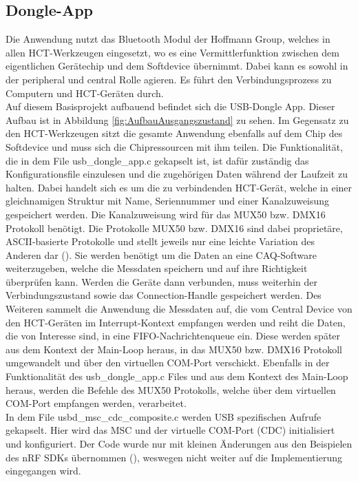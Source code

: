 \subsection{Dongle-App}
Die Anwendung nutzt das Bluetooth Modul der Hoffmann Group, welches in allen \ac{HCT}-Werkzeugen eingesetzt, wo es eine Vermittlerfunktion zwischen dem eigentlichen Gerätechip und dem Softdevice übernimmt. Dabei kann es sowohl in der peripheral und central Rolle agieren. Es führt den Verbindungsprozess zu Computern und \ac{HCT}-Geräten durch. \\
Auf diesem Basisprojekt aufbauend befindet sich die \ac{USB}-Dongle App. Dieser Aufbau ist in Abbildung \ref{fig:AufbauAusgangszustand} zu sehen. Im Gegensatz zu den \ac{HCT}-Werkzeugen sitzt die gesamte Anwendung ebenfalls auf dem Chip des Softdevice und muss sich die Chipressourcen mit ihm teilen. Die Funktionalität, die in dem File usb\_dongle\_app.c gekapselt ist, ist dafür zuständig das Konfigurationsfile einzulesen und die zugehörigen Daten während der Laufzeit zu halten. Dabei handelt sich es um die zu verbindenden \ac{HCT}-Gerät, welche in einer gleichnamigen Struktur mit Name, Seriennummer und einer Kanalzuweisung gespeichert werden. Die Kanalzuweisung wird für das MUX50 bzw. DMX16 Protokoll benötigt. Die Protokolle MUX50 bzw. DMX16 sind dabei proprietäre, \ac{ASCII}-basierte Protokolle und stellt jeweils nur eine leichte Variation des Anderen dar (\cite[s. 33]{HCT_Windows_App_Manual}). Sie werden benötigt um die Daten an eine \ac{CAQ}-Software weiterzugeben, welche die Messdaten speichern und auf ihre Richtigkeit überprüfen kann. Werden die Geräte dann verbunden, muss weiterhin der Verbindungszustand sowie das Connection-Handle gespeichert werden. Des Weiteren sammelt die Anwendung die Messdaten auf, die vom Central Device von den \ac{HCT}-Geräten im Interrupt-Kontext empfangen werden und reiht die Daten, die von Interesse sind, in eine \ac{FIFO}-Nachrichtenqueue ein. Diese werden später aus dem Kontext der Main-Loop heraus, in das MUX50 bzw. DMX16 Protokoll umgewandelt und über den virtuellen COM-Port verschickt. Ebenfalls in der Funktionalität des usb\_dongle\_app.c Files und aus dem Kontext des Main-Loop heraus, werden die Befehle des MUX50 Protokolls, welche über dem virtuellen COM-Port empfangen werden, verarbeitet.\\
In dem File usbd\_msc\_cdc\_composite.c werden \ac{USB} spezifischen Aufrufe gekapselt. Hier wird das \ac{MSC} und der virtuelle COM-Port (\ac{CDC}) initialisiert und konfiguriert. Der Code wurde nur mit kleinen Änderungen aus den Beispielen des nRF SDKs übernommen (\cite{NRF_USB_examples}), weswegen nicht weiter auf die Implementierung eingegangen wird.\\
